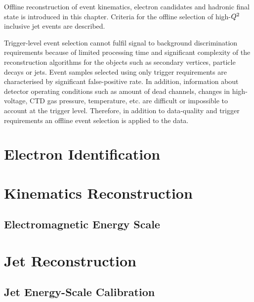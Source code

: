 Offline reconstruction of event kinematics, electron candidates and hadronic final state is introduced in this chapter. Criteria for the offline selection of high-$\mbox{${Q^2}$}$ inclusive jet events are described. 

Trigger-level event selection cannot fulfil signal to background discrimination requirements because of limited processing time and significant complexity of the reconstruction algorithms for the objects such as secondary vertices, particle decays or jets. Event samples selected using only trigger requirements are characterised by significant false-positive rate. In addition, information about detector operating conditions such as amount of dead channels, changes in high-voltage, CTD gas pressure, temperature, etc. are difficult or impossible to account at the trigger level. Therefore, in addition to data-quality and trigger requirements an offline event selection is applied to the data.

\section{Electron Identification}
\label{sec:eleid}


\section{Kinematics Reconstruction}
\label{sec:kinrec}


\subsection{Electromagnetic Energy Scale}
\label{subsec:eleenescale}


\section{Jet Reconstruction}
\label{sec:jetreco}


\subsection{Jet Energy-Scale Calibration}
\label{subsec:jetcalib}


